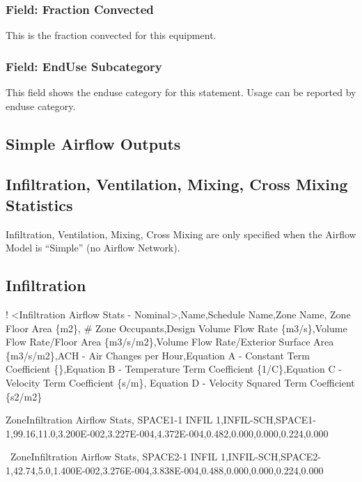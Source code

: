 \subsubsection{Field: Fraction Convected}\label{field-fraction-convected-4}

This is the fraction convected for this equipment.

\subsubsection{Field: EndUse Subcategory}\label{field-enduse-subcategory}

This field shows the enduse category for this statement. Usage can be reported by enduse category.

\subsection{Simple Airflow Outputs}\label{simple-airflow-outputs}

\subsection{Infiltration, Ventilation, Mixing, Cross Mixing Statistics}\label{infiltration-ventilation-mixing-cross-mixing-statistics}

Infiltration, Ventilation, Mixing, Cross Mixing are only specified when the Airflow Model is ``Simple'' (no Airflow Network).

\subsection{Infiltration}\label{infiltration}

! \textless{}Infiltration Airflow Stats - Nominal\textgreater{},Name,Schedule Name,Zone Name, Zone Floor Area \{m2\}, \# Zone Occupants,Design Volume Flow Rate \{m3/s\},Volume Flow Rate/Floor Area \{m3/s/m2\},Volume Flow Rate/Exterior Surface Area \{m3/s/m2\},ACH - Air Changes per Hour,Equation A - Constant Term Coefficient \{\},Equation B - Temperature Term Coefficient \{1/C\},Equation C - Velocity Term Coefficient \{s/m\}, Equation D - Velocity Squared Term Coefficient \{s2/m2\}

ZoneInfiltration Airflow Stats, SPACE1-1 INFIL 1,INFIL-SCH,SPACE1-1,99.16,11.0,3.200E-002,3.227E-004,4.372E-004,0.482,0.000,0.000,0.224,0.000

~ZoneInfiltration Airflow Stats, SPACE2-1 INFIL 1,INFIL-SCH,SPACE2-1,42.74,5.0,1.400E-002,3.276E-004,3.838E-004,0.488,0.000,0.000,0.224,0.000

